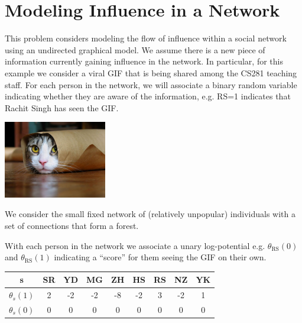 \documentclass[submit]{harvardml}
\theoremstyle{plain}
\begin{document}
\section*{Modeling Influence in a Network}

This problem considers modeling the flow of influence within a social
network using an undirected graphical model. We assume there is a new
piece of information currently gaining influence in the network. In
particular, for this example we consider a viral GIF that is being
shared among the CS281 teaching staff. For each person in the network,
we will associate a binary random variable indicating whether they are
aware of the information, e.g. RS=1 indicates that Rachit Singh has seen the GIF.
  \begin{center}
    \includegraphics[width=4.5cm]{cat}
  \end{center}
\noindent We consider the small fixed network of (relatively unpopular) individuals with a set of connections that
  form a forest.

  \vspace{0.25cm}
  \begin{center}
 \end{center}
\noindent With each person in the network we associate a unary log-potential e.g. $\theta_{\text{RS}}(0)$ and $\theta_{\text{RS}}(1)$  indicating a ``score'' for them seeing the GIF on their own.

 \begin{center}
   \begin{tabular}{ccccccccc}
     \toprule
     s & SR & YD & MG & ZH & HS & RS & NZ & YK \\
     \midrule
     $\theta_s(1)$ & 2 & -2 & -2 & -8 & -2 & 3 & -2 & 1 \\
     $\theta_s(0)$ & 0 & 0 & 0 & 0 & 0 & 0 & 0 & 0 \\
     \bottomrule
   \end{tabular}
 \end{center}
\end{document}
